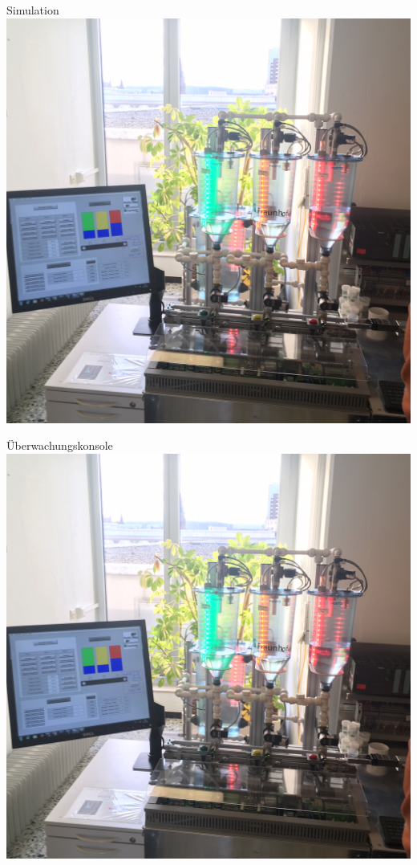 \documentclass[22pt]{beamer}
\begin{document}
\begin{frame}{Simulation}
 \includegraphics[height=\textheight,width=\textwidth,keepaspectratio=true]{Demoanlage_IOSB.jpg}
\end{frame}

\begin{frame}{Überwachungskonsole}
 \includegraphics[height=\textheight,width=\textwidth,keepaspectratio=true]{Demoanlage_IOSB.jpg}
\end{frame}
\end{document}
